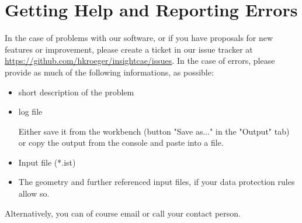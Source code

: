 \documentclass{sd_report}
\begin{document}
\section{Getting Help and Reporting Errors}

In the case of problems with our software, or if you have proposals for new features or improvement, please create a ticket in our issue tracker at \url{https://github.com/hkroeger/insightcae/issues}. In the case of errors, please provide as much of the following informations, as possible:

\begin{itemize}
\item short description of the problem

\item log file

Either save it from the workbench (button "Save as..." in the "Output" tab) or copy the output from the console and paste into a file.

\item Input file (*.ist)

\item The geometry and further referenced input files, if your data protection rules allow so.
\end{itemize}

Alternatively, you can of course email or call your \sd contact person.
\end{document}
